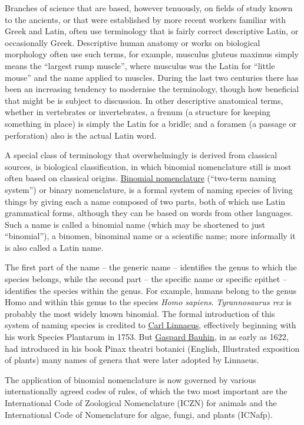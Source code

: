 \documentclass[
]{article}
\begin{document}
Branches of science that are based, however tenuously, on fields of
study known to the ancients, or that were established by more recent
workers familiar with Greek and Latin, often use terminology that is
fairly correct descriptive Latin, or occasionally Greek. Descriptive
human anatomy or works on biological morphology often use such terms,
for example, musculus gluteus maximus simply means the ``largest rump
muscle'', where musculus was the Latin for ``little mouse'' and the name
applied to muscles. During the last two centuries there has been an
increasing tendency to modernise the terminology, though how beneficial
that might be is subject to discussion. In other descriptive anatomical
terms, whether in vertebrates or invertebrates, a frenum (a structure
for keeping something in place) is simply the Latin for a bridle; and a
foramen (a passage or perforation) also is the actual Latin word.

A special class of terminology that overwhelmingly is derived from
classical sources, is biological classification, in which binomial
nomenclature still is most often based on classical origins.
\href{https://en.wikipedia.org/wiki/Binomial_nomenclature}{Binomial
nomenclature} (``two-term naming system'') or binary nomenclature, is a
formal system of naming species of living things by giving each a name
composed of two parts, both of which use Latin grammatical forms,
although they can be based on words from other languages. Such a name is
called a binomial name (which may be shortened to just ``binomial''), a
binomen, binominal name or a scientific name; more informally it is also
called a Latin name.

The first part of the name -- the generic name -- identifies the genus
to which the species belongs, while the second part -- the specific name
or specific epithet -- identifies the species within the genus. For
example, humans belong to the genus Homo and within this genus to the
species \emph{Homo sapiens}. \emph{Tyrannosaurus rex} is probably the
most widely known binomial. The formal introduction of this system of
naming species is credited to
\href{https://en.wikipedia.org/wiki/Carl_Linnaeus}{Carl Linnaeus},
effectively beginning with his work Species Plantarum in 1753. But
\href{https://en.wikipedia.org/wiki/Gaspard_Bauhin}{Gaspard Bauhin}, in
as early as 1622, had introduced in his book Pinax theatri botanici
(English, Illustrated exposition of plants) many names of genera that
were later adopted by Linnaeus.

The application of binomial nomenclature is now governed by various
internationally agreed codes of rules, of which the two most important
are the International Code of Zoological Nomenclature (ICZN) for animals
and the International Code of Nomenclature for algae, fungi, and plants
(ICNafp).
\end{document}
